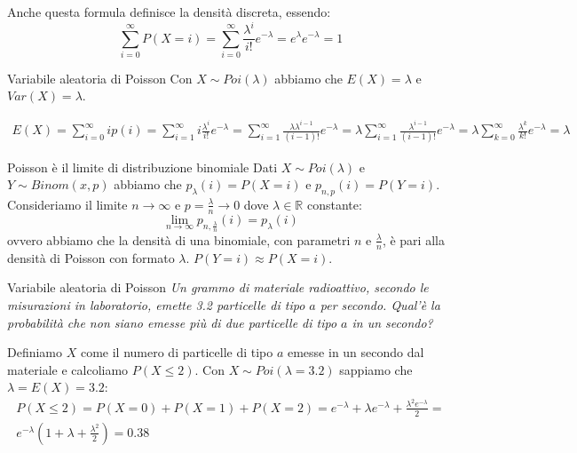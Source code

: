 Anche questa formula definisce la densità discreta, essendo:
\begin{equation*}
    \sum^\infty_{i=0}P(X=i)=\sum^\infty_{i=0}\frac{\lambda^i}{i!}e^{-\lambda}=e^\lambda e^{-\lambda}=1
\end{equation*}

\begin{Lemma}{Variabile aleatoria di Poisson}{}
    Con $X\sim Poi(\lambda)$ abbiamo che $E(X)=\lambda$ e $Var(X)=\lambda$.
    \begin{demonstration}
        \begin{align*}
            E(X)=\sum^\infty_{i=0}ip(i)=\sum^\infty_{i=1}i\frac{\lambda^i}{i!}e^{-\lambda}=\sum^\infty_{i=1}\frac{\lambda\lambda^{i-1}}{(i-1)!}e^{-\lambda}=\lambda\sum^\infty_{i=1}\frac{\lambda^{i-1}}{(i-1)!}e^{-\lambda}=\lambda\sum^\infty_{k=0}\frac{\lambda^k}{k!}e^{-\lambda}=\lambda
        \end{align*}
    \end{demonstration}
\end{Lemma}

\begin{Proposition}{Poisson è il limite di distribuzione binomiale}{}
    Dati $X\sim Poi(\lambda)$ e $Y\sim Binom(x,p)$ abbiamo che $p_\lambda(i)=P(X=i)$ e $p_{n,p}(i)=P(Y=i)$. Consideriamo il limite $n\to\infty$ e $p=\frac{\lambda}{n}\to0$ dove $\lambda\in\mathbb{R}$ constante:
    \begin{equation*}
        \lim_{n\to\infty}p_{n,\frac{\lambda}{n}}(i)=p_\lambda(i)
    \end{equation*}
    ovvero abbiamo che la densità di una binomiale, con parametri $n$ e $\frac{\lambda}{n}$, è pari alla densità di Poisson con formato $\lambda$. $P(Y=i)\approx P(X=i)$.
\end{Proposition}

\begin{Example}{Variabile aleatoria di Poisson}{}
    \textit{Un grammo di materiale radioattivo, secondo le misurazioni in laboratorio, emette 3.2 particelle di tipo $a$ per secondo. Qual'è la probabilità che non siano emesse più di due particelle di tipo $a$ in un secondo?}

    Definiamo $X$ come il numero di particelle di tipo $a$ emesse in un secondo dal materiale e calcoliamo $P(X\leq2)$. Con $X\sim Poi(\lambda=3.2)$ sappiamo che $\lambda=E(X)=3.2$:
    \begin{align*}
        P(X\leq 2)=P(X=0)+P(X=1)+P(X=2)=e^{-\lambda}+\lambda e^{-\lambda}+\frac{\lambda^2e^{-\lambda}}{2}=\\e^{-\lambda}(1+\lambda+\frac{\lambda^2}{2})=0.38
    \end{align*}
\end{Example}

